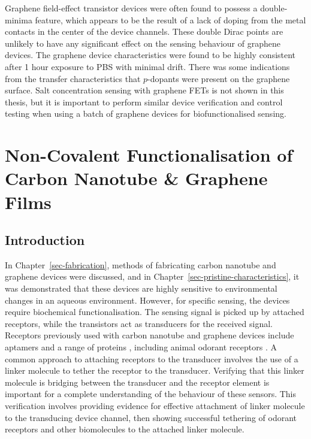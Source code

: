\documentclass[
  a4paper,
]{scrbook}
\begin{document}
Graphene field-effect transistor devices were often found to possess a
double-minima feature, which appears to be the result of a lack of
doping from the metal contacts in the center of the device channels.
These double Dirac points are unlikely to have any significant effect on
the sensing behaviour of graphene devices. The graphene device
characteristics were found to be highly consistent after 1 hour exposure
to PBS with minimal drift. There was some indications from the transfer
characteristics that \(p\)-dopants were present on the graphene surface.
Salt concentration sensing with graphene FETs is not shown in this
thesis, but it is important to perform similar device verification and
control testing when using a batch of graphene devices for
biofunctionalised sensing.


\hypertarget{sec-noncovalent-functionalisation}{%
\chapter{Non-Covalent Functionalisation of Carbon Nanotube \& Graphene
Films}\label{sec-noncovalent-functionalisation}}

\hypertarget{introduction-4}{%
\section{Introduction}\label{introduction-4}}

In Chapter~\ref{sec-fabrication}, methods of fabricating carbon nanotube
and graphene devices were discussed, and in
Chapter~\ref{sec-pristine-characteristics}, it was demonstrated that
these devices are highly sensitive to environmental changes in an
aqueous environment. However, for specific sensing, the devices require
biochemical functionalisation. The sensing signal is picked up by
attached receptors, while the transistors act as transducers for the
received signal. Receptors previously used with carbon nanotube and
graphene devices include aptamers
\autocite{Khan2021,Nguyen2021,Shkodra2021,Nekrasov2021,Mishyn2022,Cassie2023}
and a range of proteins \autocite{Lerner2014,Ahn2020,Tong2020,Wang2020},
including animal odorant receptors
\autocite{Goldsmith2011,Lee2018,Murugathas2019a,Murugathas2020,Moon2020,Yoo2022}.
A common approach to attaching receptors to the transducer involves the
use of a linker molecule to tether the receptor to the transducer.
Verifying that this linker molecule is bridging between the transducer
and the receptor element is important for a complete understanding of
the behaviour of these sensors. This verification involves providing
evidence for effective attachment of linker molecule to the transducing
device channel, then showing successful tethering of odorant receptors
and other biomolecules to the attached linker molecule.
\end{document}

